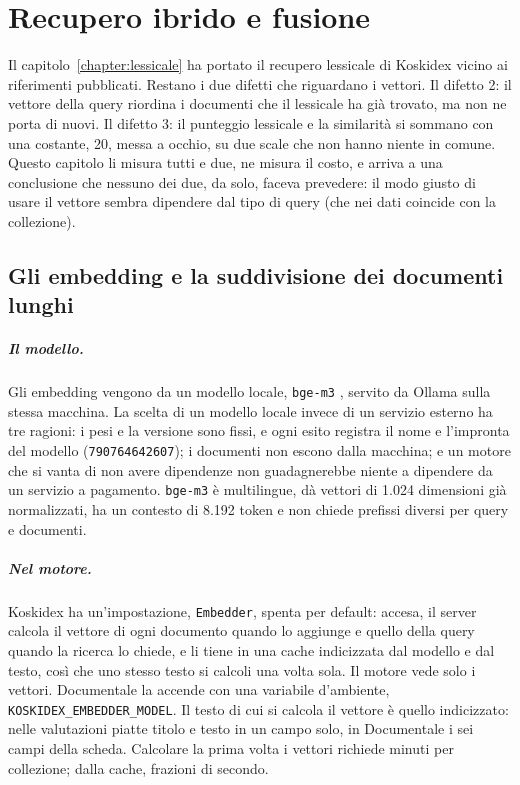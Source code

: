\chapter{Recupero ibrido e fusione}\label{chapter:ibrido}

Il capitolo~\ref{chapter:lessicale} ha portato il recupero lessicale di Koskidex
vicino ai riferimenti pubblicati. Restano i due difetti che riguardano i vettori.
Il difetto 2: il vettore della query riordina i documenti che il lessicale ha già
trovato, ma non ne porta di nuovi. Il difetto 3: il punteggio lessicale e la
similarità si sommano con una costante, 20, messa a occhio, su due scale che non
hanno niente in comune. Questo capitolo li misura tutti e due, ne misura il costo,
e arriva a una conclusione che nessuno dei due, da solo, faceva prevedere: il modo
giusto di usare il vettore sembra dipendere dal tipo di query (che nei dati coincide con la collezione).

\section{Gli embedding e la suddivisione dei documenti lunghi}\label{sec:embedding}

\paragraph{Il modello.} Gli embedding vengono da un modello locale, \texttt{bge-m3}
\cite{chen2024bgem3}, servito da Ollama sulla stessa macchina. La scelta di un
modello locale invece di un servizio esterno ha tre ragioni: i pesi e la versione
sono fissi, e ogni esito registra il nome e l'impronta del modello
(\texttt{790764642607}); i documenti non escono dalla macchina; e un motore che si
vanta di non avere dipendenze non guadagnerebbe niente a dipendere da un servizio
a pagamento. \texttt{bge-m3} è multilingue, dà vettori di 1.024 dimensioni già
normalizzati, ha un contesto di 8.192 token e non chiede prefissi diversi per
query e documenti.

\paragraph{Nel motore.} Koskidex ha un'impostazione, \texttt{Embedder}, spenta per
default: accesa, il server calcola il vettore di ogni documento quando lo aggiunge
e quello della query quando la ricerca lo chiede, e li tiene in una cache indicizzata
dal modello e dal testo, così che uno stesso testo si calcoli una volta sola. Il
motore vede solo i vettori.
Documentale la accende con una variabile d'ambiente,
\texttt{KOSKIDEX\_EMBEDDER\_MODEL}. Il testo di cui si calcola il vettore è quello
indicizzato: nelle valutazioni piatte titolo e testo in un campo solo, in
Documentale i sei campi della scheda. Calcolare la prima volta i vettori richiede
minuti per collezione; dalla cache, frazioni di secondo.

